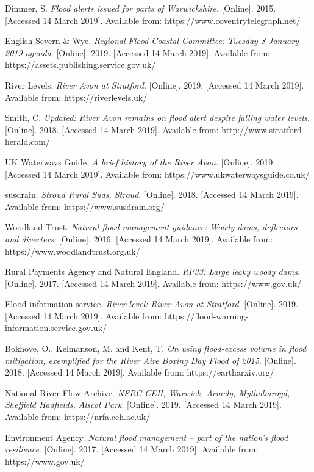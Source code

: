 \documentclass[11pt,a4paper]{article}
\begin{document}
\begin{thebibliography}{}
Dimmer, S. \textit{Flood alerts issued for parts of Warwickshire}. [Online]. 2015. [Accessed 14 March 2019]. Available from: https://www.coventrytelegraph.net/

English Severn \& Wye. \textit{Regional Flood Coastal Committee: Tuesday 8 January 2019 agenda}. [Online]. 2019. [Accessed 14 March 2019]. Available from: https://assets.publishing.service.gov.uk/

River Levels. \textit{River Avon at Stratford}. [Online]. 2019. [Accessed 14 March 2019]. Available from: https://riverlevels.uk/

Smith, C. \textit{Updated: River Avon remains on flood alert despite falling water levels}. [Online]. 2018. [Accessed 14 March 2019]. Available from: http://www.stratford-herald.com/

UK Waterways Guide. \textit{A brief history of the River Avon}. [Online]. 2019. [Accessed 14 March 2019]. Available from: https://www.ukwaterwaysguide.co.uk/

\bibitem{}
susdrain. \textit{Stroud Rural Suds, Stroud}. [Online]. 2018. [Accessed 14 March 2019]. Available from: https://www.susdrain.org/

\bibitem{}
Woodland Trust. \textit{Natural flood management guidance: Woody dams, deflectors and diverters}. [Online]. 2016. [Accessed 14 March 2019]. Available from: https://www.woodlandtrust.org.uk/

Rural Payments Agency and Natural England. \textit{RP33: Large leaky woody dams}. [Online]. 2017. [Accessed 14 March 2019]. Available from: https://www.gov.uk/

Flood information service. \textit{River level: River Avon at Stratford}. [Online]. 2019. [Accessed 14 March 2019]. Available from: https://flood-warning-information.service.gov.uk/

Bokhove, O., Kelmanson, M. and Kent, T. \textit{On using flood-excess volume in flood mitigation, exemplified for the River Aire Boxing Day Flood of 2015}. [Online]. 2018. [Accessed 14 March 2019]. Available from: https://eartharxiv.org/

National River Flow Archive. \textit{NERC CEH, Warwick, Armely, Mytholmroyd, Sheffield Hadfields, Alscot Park}. [Online]. 2019. [Accessed 14 March 2019]. Available from: https://nrfa.ceh.ac.uk/

Environment Agency. \textit{Natural flood management – part of the nation’s flood resilience}. [Online]. 2017. [Accessed 14 March 2019]. Available from: https://www.gov.uk/


\end{thebibliography}
\end{document}
